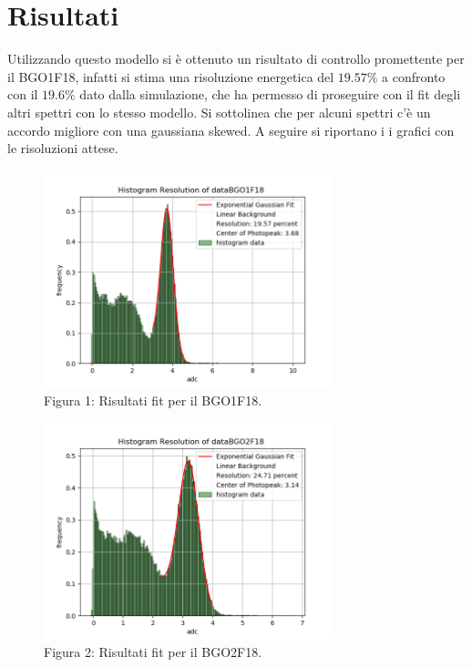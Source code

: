 \documentclass[a4paper]{article}
\begin{document}
\section{Risultati}
Utilizzando questo modello si è ottenuto un risultato di controllo promettente per il BGO1F18, infatti si stima una risoluzione energetica del $19.57\%$ a confronto con il $19.6\%$ dato dalla simulazione, che ha permesso di proseguire con il fit degli altri spettri con lo stesso modello. Si sottolinea che per alcuni spettri c'è un accordo migliore con una gaussiana skewed. A seguire si riportano i i grafici con le risoluzioni attese.
\begin{figure}[H]
\centering
\includegraphics[width=0.75\textwidth]{histdataBGO1F18}
\caption{Figura 1: Risultati fit per il BGO1F18.}
\end{figure}
\begin{figure}[H]
\centering
\includegraphics[width=0.75\textwidth]{histdataBGO2F18}
\caption{Figura 2: Risultati fit per il BGO2F18.}
\end{figure}
\end{document}
